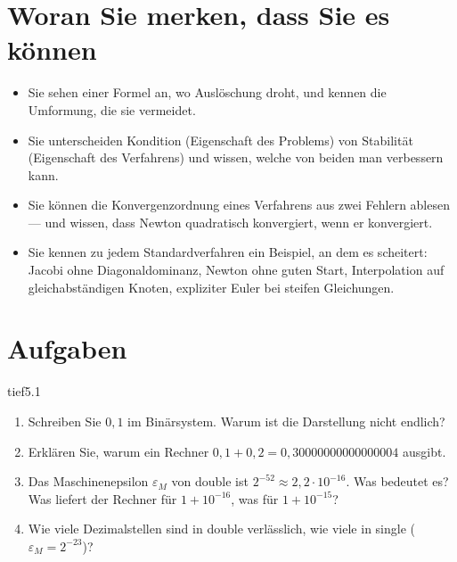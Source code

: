\section{Woran Sie merken, dass Sie es können}
\begin{itemize}[leftmargin=1.2em,itemsep=2pt]
\item Sie sehen einer Formel an, wo Auslöschung droht, und kennen die Umformung, die sie vermeidet.
\item Sie unterscheiden Kondition (Eigenschaft des Problems) von Stabilität (Eigenschaft des Verfahrens) und wissen, welche von beiden man verbessern kann.
\item Sie können die Konvergenzordnung eines Verfahrens aus zwei Fehlern ablesen --- und wissen, dass Newton quadratisch konvergiert, wenn er konvergiert.
\item Sie kennen zu jedem Standardverfahren ein Beispiel, an dem es scheitert: Jacobi ohne Diagonaldominanz, Newton ohne guten Start, Interpolation auf gleichabständigen Knoten, expliziter Euler bei steifen Gleichungen.
\end{itemize}

\section{Aufgaben}

\begin{karte}{tief}{5.1}{\typtypisch}{}
\begin{enumerate}[label=(\alph*),leftmargin=1.6em,itemsep=2pt]
\item Schreiben Sie $0{,}1$ im Binärsystem. Warum ist die Darstellung nicht endlich?
\item Erklären Sie, warum ein Rechner $0{,}1 + 0{,}2 = 0{,}30000000000000004$ ausgibt.
\item Das Maschinenepsilon $\varepsilon_M$ von double ist $2^{-52}\approx2{,}2\cdot10^{-16}$. Was bedeutet es? Was liefert der Rechner für $1 + 10^{-16}$, was für $1 + 10^{-15}$?
\item Wie viele Dezimalstellen sind in double verlässlich, wie viele in single ($\varepsilon_M = 2^{-23}$)?
\end{enumerate}
\end{karte}

